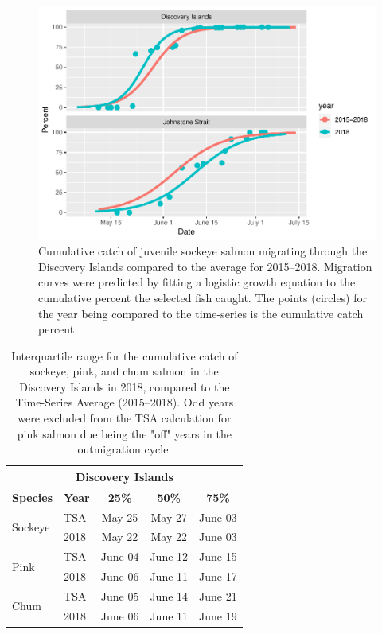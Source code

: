 \documentclass[fleqn,10pt]{wlpeerj} %
\begin{document}
\begin{figure}
\includegraphics[width=0.8\linewidth]{peer_j_migration_dynamics_files/figure-latex/mt-1} \caption{Cumulative catch of juvenile sockeye salmon migrating through the Discovery Islands compared to the average for 2015--2018. Migration curves were predicted by fitting a logistic growth equation to the cumulative percent the selected fish caught. The points (circles) for the year being compared to the time-series is the cumulative catch percent}\label{fig:mt}
\end{figure}

\begin{table}[ht]
\centering
\begin{tabular}{l|l|c|c|c}
\multicolumn{5}{c}{\textbf{Discovery Islands}} \\
\hline
\textbf{Species} & \textbf{Year} & \textbf{25\%} & \textbf{50\%} & \textbf{75\%} \\
\hline
\multirow{2}{*}{Sockeye} & TSA & May 25 & May 27 & June 03 \\
& 2018 & May 22 & May 22 & June 03 \\
\hline
\multirow{2}{*}{Pink} & TSA & June 04 & June 12 & June 15 \\
& 2018 & June 06 & June 11 & June 17 \\
\hline
\multirow{2}{*}{Chum} & TSA & June 05 & June 14 & June 21 \\
& 2018 & June 06 & June 11 & June 19 \\
\end{tabular}
\caption{\label{tab:widgets}Interquartile range for the cumulative catch of sockeye, pink, and chum salmon in the Discovery Islands in 2018, compared to the Time-Series Average (2015--2018). Odd years were excluded from the TSA calculation for pink salmon due being the "off" years in the outmigration cycle.}
\end{table}
\end{document}
